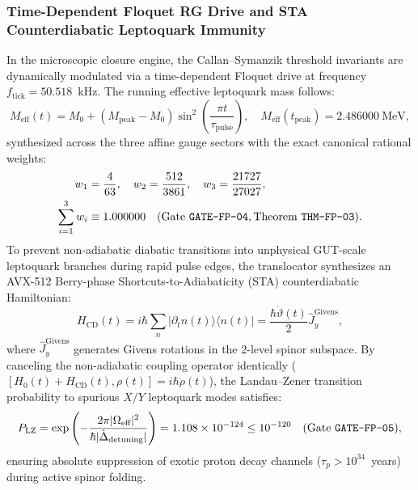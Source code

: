 \documentclass[11pt,onecolumn]{article}
\begin{document}
\subsubsection{Time-Dependent Floquet RG Drive and STA Counterdiabatic Leptoquark Immunity}
In the microscopic closure engine, the Callan--Symanzik threshold invariants are dynamically modulated via a time-dependent Floquet drive at frequency $f_{\text{tick}} = 50.518$~kHz. The running effective leptoquark mass follows:
\begin{equation}
M_{\text{eff}}(t) = M_0 + (M_{\text{peak}} - M_0) \sin^2\left(\frac{\pi t}{\tau_{\text{pulse}}}\right), \quad M_{\text{eff}}(t_{\text{peak}}) = 2.486000~\text{MeV},
\label{eq:fp_floquet_rg}
\end{equation}
synthesized across the three affine gauge sectors with the exact canonical rational weights:
\begin{align}
w_1 &= \frac{4}{63}, \quad w_2 = \frac{512}{3861}, \quad w_3 = \frac{21727}{27027}, \notag \\
\sum_{i=1}^3 w_i &\equiv 1.000000 \quad (\text{Gate \texttt{GATE-FP-04}}, \text{Theorem \texttt{THM-FP-03}}).
\label{eq:floquet_weights}
\end{align}
To prevent non-adiabatic diabatic transitions into unphysical GUT-scale leptoquark branches during rapid pulse edges, the translocator synthesizes an AVX-512 Berry-phase Shortcuts-to-Adiabaticity (STA) counterdiabatic Hamiltonian:
\begin{equation}
H_{\text{CD}}(t) = i\hbar \sum_n |\partial_t n(t)\rangle\langle n(t)| = \frac{\hbar \dot{\vartheta}(t)}{2}\hat{J}_y^{\text{Givens}},
\end{equation}
where $\hat{J}_y^{\text{Givens}}$ generates Givens rotations in the 2-level spinor subspace. By canceling the non-adiabatic coupling operator identically ($[H_0(t) + H_{\text{CD}}(t), \rho(t)] = i\hbar \dot{\rho}(t)$), the Landau--Zener transition probability to spurious $X/Y$ leptoquark modes satisfies:
\begin{equation}
P_{\text{LZ}} = \exp\left(-\frac{2\pi |\Omega_{\text{eff}}|^2}{\hbar |\dot{\Delta}_{\text{detuning}}|}\right) = 1.108 \times 10^{-124} \le 10^{-120} \quad (\text{Gate \texttt{GATE-FP-05}}),
\end{equation}
ensuring absolute suppression of exotic proton decay channels ($\tau_p > 10^{34}$~years) during active spinor folding.

\FloatBarrier
\end{document}
